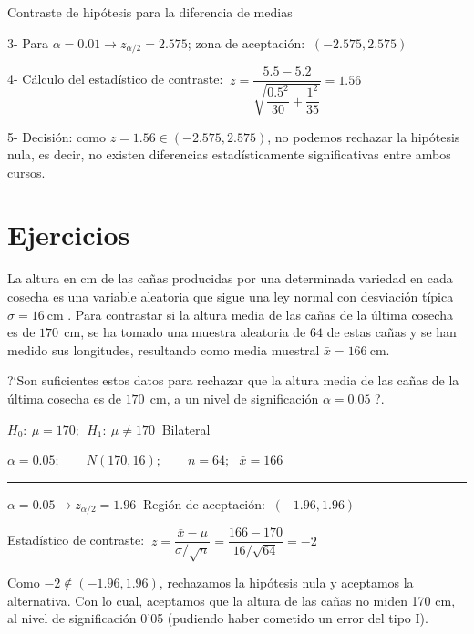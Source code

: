 \begin{myalertblock}{Contraste de hipótesis para la diferencia de medias}
\begin{ejemplo}
\begin{ejre}
\vspace{2mm} 3- Para $\alpha=0.01 \to z_{\alpha/2}=2.575$; zona de aceptación: $\ (-2.575,2.575)$

\vspace{2mm} 4- Cálculo del estadístico de contraste: $\ z=\dfrac{5.5-5.2}{\sqrt{\dfrac{0.5^2}{30}+\dfrac{1^2}{35}}}=1.56$

\vspace{2mm} 5- Decisión: como $z=1.56 \in  (-2.575,2.575)$, no podemos rechazar la hipótesis nula, es decir, no existen diferencias estadísticamente significativas entre ambos cursos.
\end{ejre}	
\end{ejemplo}
\end{myalertblock}
	




\section{Ejercicios}

\begin{ejemplo}
\begin{ejer}
La altura en $\mathrm{cm}$ de las cañas producidas por una determinada variedad en cada cosecha es una variable aleatoria que sigue una ley normal con desviación típica $\sigma=16\ \mathrm{cm}$ . Para contrastar si la altura media de las cañas de la última cosecha es de $170\ \ \mathrm{cm}$, se ha tomado una muestra aleatoria de $64$ de estas cañas y se han medido sus longitudes, resultando como media muestral $\bar x = 166 \ \mathrm{cm}$.

?`Son suficientes estos datos para rechazar que la altura media de las cañas de la última cosecha es de $170\ \ \mathrm{cm}$, a un nivel de significación $\alpha=0.05$ ?.	
\end{ejer}	
\end{ejemplo}

$H_0:\ \mu=170;\ \ H_1:\ \mu \neq 170\ $ Bilateral

$\alpha=0.05;\qquad N(170,16);\qquad n=64;\ \ \ \bar x=166$

\rule{150pt}{0.1pt}

$\alpha=0.05 \to z_{\alpha/2}=1.96\ $ Región de aceptación: $\ (-1.96,1.96)$

Estadístico de contraste: $\ z=\dfrac{\bar x - \mu}{\sigma/\sqrt{n}}=\dfrac{166-170}{16/\sqrt{64}}=-2$

Como $-2 \notin (-1.96,1.96)$, rechazamos la hipótesis nula y aceptamos la alternativa. Con lo cual, aceptamos que la altura de las cañas no miden 170 cm, al nivel de significación 0’05 (pudiendo haber cometido un error del tipo I).
	
